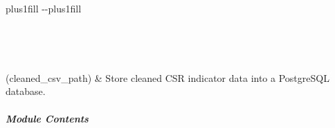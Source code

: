 \documentclass[letterpaper,10pt,english]{sphinxmanual}
\begin{document}
\begin{savenotes}
\sphinxatlongtablestart
\sphinxthistablewithglobalstyle
\sphinxthistablewithnovlinesstyle
\makeatletter
  \LTleft \@totalleftmargin plus1fill
  \LTright\dimexpr\columnwidth-\@totalleftmargin-\linewidth\relax plus1fill
\makeatother
\begin{longtable}{}
\sphinxtoprule
\endfirsthead

\\
\sphinxtoprule
\endhead

\sphinxbottomrule
{}\\
\endfoot

\endlastfoot
\sphinxtableatstartofbodyhook

\sphinxAtStartPar
{\hyperref[\detokenize{autoapi/modules/db/data_storage/index:modules.db.data_storage.store_clean_data_to_postgres}]{}}(cleaned\_csv\_path)
&
\sphinxAtStartPar
Store cleaned CSR indicator data into a PostgreSQL database.
\\
\sphinxbottomrule
\end{longtable}
\sphinxtableafterendhook
\sphinxatlongtableend
\end{savenotes}


\subparagraph{Module Contents}
\label{\detokenize{autoapi/modules/db/data_storage/index:module-contents}}
\end{document}
